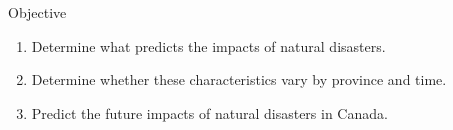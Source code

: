 \begin{frame}{Objective}
\begin{enumerate}
        \item Determine what predicts the impacts of natural disasters.
        \item Determine whether these characteristics vary by province and time.
        \item Predict the future impacts of natural disasters in Canada.
\end{enumerate}
\end{frame}